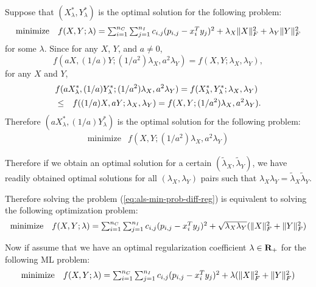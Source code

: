 Suppose that $(X_\lambda^\ast, Y_\lambda^\ast)$ is the optimal solution for the following problem:
\begin{equation}
\label{eq:als-min-prob-diff-reg}
\begin{array}{ll}
\mbox{minimize} &
f(X,Y; \lambda) = \sum_{i=1}^{{n_C}} \sum_{j=1}^{{n_I}} c_{i,j} (p_{i,j} - x_i^Ty_j)^2 + \lambda_X \|X\|_F^2 + \lambda_Y \|Y\|_F^2
\end{array}
\end{equation}
for some $\lambda$.
Since for any $X$, $Y$, and $a\neq0$,
\begin{equation}
f(aX, (1/a) Y; (1/a^2) \lambda_X, a^2\lambda_Y)
= f(X, Y; \lambda_X, \lambda_Y),
\end{equation}
for any $X$ and $Y$,
\begin{eqnarray*}
\lefteqn{
f(aX_\lambda^\ast, (1/a) Y_\lambda^\ast; (1/a^2) \lambda_X, a^2\lambda_Y)
= f(X_\lambda^\ast, Y_\lambda^\ast; \lambda_X, \lambda_Y)
}
\\
&\leq& f((1/a)X, aY; \lambda_X, \lambda_Y)
= f(X, Y; (1/a^2) \lambda_X, a^2\lambda_Y).
\end{eqnarray*}
Therefore 
$(aX_\lambda^\ast, (1/a) Y_\lambda^\ast)$ is the optimal solution for the following problem:
\begin{equation}
\begin{array}{ll}
\mbox{minimize} & f(X,Y; (1/a^2) \lambda_X, a^2\lambda_Y)
\end{array}
\end{equation}

Therefore if we obtain an optimal solution for a certain $(\tilde{\lambda}_X, \tilde{\lambda}_Y)$, we have readily obtained optimal solutions
for all $(\lambda_X, \lambda_Y)$ pairs such that $\lambda_X \lambda_Y = \tilde{\lambda}_X \tilde{\lambda}_Y$.

Therefore solving the problem (\ref{eq:als-min-prob-diff-reg}) is equivalent to solving the following optimization problem:
\begin{equation}
\begin{array}{ll}
\mbox{minimize} &
f(X,Y; \lambda) = \sum_{i=1}^{{n_C}} \sum_{j=1}^{{n_I}} c_{i,j} (p_{i,j} - x_i^Ty_j)^2 + \sqrt{\lambda_X \lambda_Y} (\|X\|_F^2 + \|Y\|_F^2)
\end{array}
\end{equation}


Now if assume that we have an optimal regularization coefficient $\lambda\in{\mathbf{R}_+}$ for the following ML problem:
\begin{equation}
\label{eq:nefk}
\begin{array}{ll}
\mbox{minimize} &
f(X,Y; \lambda) = \sum_{i=1}^{{n_C}} \sum_{j=1}^{{n_I}} c_{i,j} (p_{i,j} - x_i^Ty_j)^2 + \lambda (\|X\|_F^2 + \|Y\|_F^2)
\end{array}
\end{equation}

